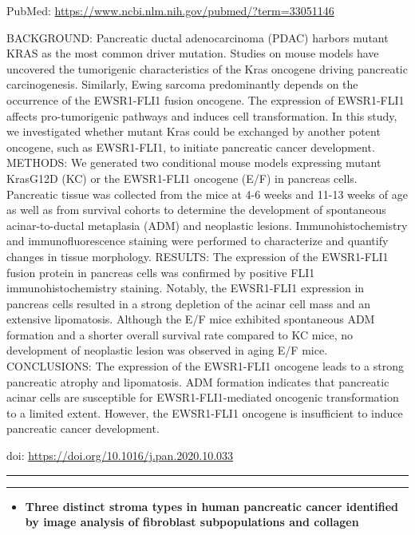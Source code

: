 \documentclass[
]{article}
\providecommand{\tightlist}{%
  \setlength{\itemsep}{0pt}\setlength{\parskip}{0pt}}
\begin{document}
PubMed: \url{https://www.ncbi.nlm.nih.gov/pubmed/?term=33051146}

BACKGROUND: Pancreatic ductal adenocarcinoma (PDAC) harbors mutant KRAS
as the most common driver mutation. Studies on mouse models have
uncovered the tumorigenic characteristics of the Kras oncogene driving
pancreatic carcinogenesis. Similarly, Ewing sarcoma predominantly
depends on the occurrence of the EWSR1-FLI1 fusion oncogene. The
expression of EWSR1-FLI1 affects pro-tumorigenic pathways and induces
cell transformation. In this study, we investigated whether mutant Kras
could be exchanged by another potent oncogene, such as EWSR1-FLI1, to
initiate pancreatic cancer development. METHODS: We generated two
conditional mouse models expressing mutant KrasG12D (KC) or the
EWSR1-FLI1 oncogene (E/F) in pancreas cells. Pancreatic tissue was
collected from the mice at 4-6 weeks and 11-13 weeks of age as well as
from survival cohorts to determine the development of spontaneous
acinar-to-ductal metaplasia (ADM) and neoplastic lesions.
Immunohistochemistry and immunofluorescence staining were performed to
characterize and quantify changes in tissue morphology. RESULTS: The
expression of the EWSR1-FLI1 fusion protein in pancreas cells was
confirmed by positive FLI1 immunohistochemistry staining. Notably, the
EWSR1-FLI1 expression in pancreas cells resulted in a strong depletion
of the acinar cell mass and an extensive lipomatosis. Although the E/F
mice exhibited spontaneous ADM formation and a shorter overall survival
rate compared to KC mice, no development of neoplastic lesion was
observed in aging E/F mice. CONCLUSIONS: The expression of the
EWSR1-FLI1 oncogene leads to a strong pancreatic atrophy and
lipomatosis. ADM formation indicates that pancreatic acinar cells are
susceptible for EWSR1-FLI1-mediated oncogenic transformation to a
limited extent. However, the EWSR1-FLI1 oncogene is insufficient to
induce pancreatic cancer development.

doi: \url{https://doi.org/10.1016/j.pan.2020.10.033}

\begin{center}\rule{0.5\linewidth}{0.5pt}\end{center}

\begin{center}\rule{0.5\linewidth}{0.5pt}\end{center}

\begin{itemize}
\tightlist
\item
  \textbf{Three distinct stroma types in human pancreatic cancer
  identified by image analysis of fibroblast subpopulations and
  collagen}
\end{itemize}
\end{document}
